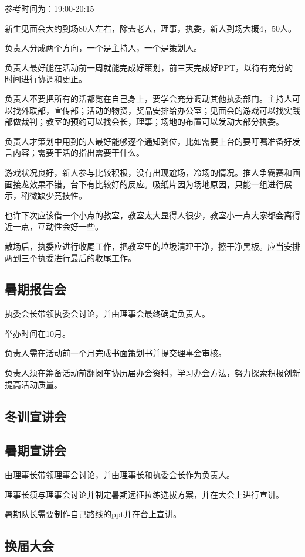 \documentclass{ctexbook}
\begin{document}
参考时间为：19:00-20:15

新生见面会大约到场80人左右，除去老人，理事，执委，新人到场大概4，50人。

负责人分成两个方向，一个是主持人，一个是策划人。

负责人最好能在活动前一周就能完成好策划，前三天完成好PPT，以待有充分的时间进行协调和更正。

负责人不要把所有的活都览在自己身上，要学会充分调动其他执委部门。主持人可以找外联部，宣传部；活动的物资，奖品安排给办公室；见面会的游戏可以找实践部做裁判；教室的预约可以找会长，理事；场地的布置可以发动大部分执委。

负责人才策划中用到的人最好能够逐个通知到位，比如需要上台的要叮嘱准备好发言内容；需要干活的指出需要干什么。

游戏状况良好，新人参与比较积极，没有出现尬场，冷场的情况。推人争霸赛和画画接龙效果不错，台下有比较好的反应。吸纸片因为场地原因，只能一组进行展示，稍微缺少竞技性。

也许下次应该借一个小点的教室，教室太大显得人很少，教室小一点大家都会离得近一点，互动性会好一些。

散场后，执委应进行收尾工作，把教室里的垃圾清理干净，擦干净黑板。应当安排两到三个执委进行最后的收尾工作。


\subsection{暑期报告会}

执委会长带领执委会讨论，并由理事会最终确定负责人。

    举办时间在10月。

    负责人需在活动前一个月完成书面策划书并提交理事会审核。

    负责人须在筹备活动前翻阅车协历届办会资料，学习办会方法，努力探索积极创新提高活动质量。

\subsection{冬训宣讲会}


\subsection{暑期宣讲会}
   由理事长带领理事会讨论，并由理事长和执委会长作为负责人。

   理事长须与理事会讨论并制定暑期远征拉练选拔方案，并在大会上进行宣讲。

   暑期队长需要制作自己路线的ppt并在台上宣讲。
\subsection{换届大会}
\end{document}
